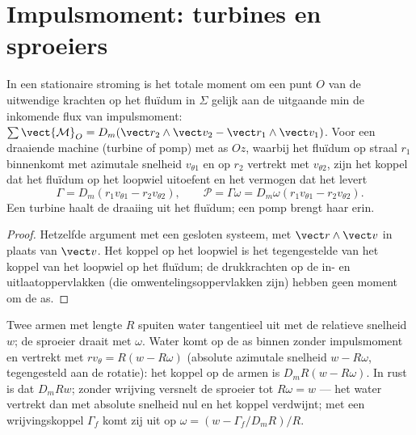 \section{Impulsmoment: turbines en sproeiers}

\begin{theorem}\label{thm:b2:flow-balances:angular}
In een stationaire stroming is het totale moment om een punt $O$ van de
uitwendige krachten op het fluïdum in $\Sigma$ gelijk aan de uitgaande min
de inkomende flux van impulsmoment:
$\sum\vect{\mathcal M}_O = D_m(\vect r_2\wedge\vect v_2 - \vect r_1
\wedge\vect v_1)$.
Voor een draaiende machine (turbine of pomp) met as $Oz$, waarbij het
fluïdum op straal $r_1$ binnenkomt met azimutale snelheid $v_{\theta1}$ en
op $r_2$ vertrekt met $v_{\theta2}$, zijn het koppel dat het fluïdum op het
loopwiel uitoefent en het vermogen dat het levert
\[
\Gamma = D_m(r_1v_{\theta1} - r_2v_{\theta2}) , \qquad
\mathcal P = \Gamma\omega = D_m\omega(r_1v_{\theta1} - r_2v_{\theta2}) .
\]
Een turbine haalt de draaiing uit het fluïdum; een pomp brengt haar erin.
\end{theorem}

\begin{proof}
Hetzelfde argument met een gesloten systeem, met $\vect r\wedge\vect v$ in
plaats van $\vect v$. Het koppel op het loopwiel is het tegengestelde van
het koppel van het loopwiel op het fluïdum; de drukkrachten op de in- en
uitlaatoppervlakken (die omwentelingsoppervlakken zijn) hebben geen moment
om de as.
\end{proof}

\begin{example}[De gazonsproeier]\label{ex:b2:flow-balances:sprinkler}
Twee armen met lengte $R$ spuiten water tangentieel uit met de relatieve
snelheid $w$; de sproeier draait met $\omega$. Water komt op de as binnen
zonder impulsmoment en vertrekt met $r v_\theta = R(w - R\omega)$ (absolute
azimutale snelheid $w - R\omega$, tegengesteld aan de rotatie): het koppel
op de armen is $D_mR(w - R\omega)$. In rust is dat $D_mRw$; zonder wrijving
versnelt de sproeier tot $R\omega = w$ --- het water vertrekt dan met
absolute snelheid nul en het koppel verdwijnt; met een wrijvingskoppel
$\Gamma_f$ komt zij uit op $\omega = (w - \Gamma_f/D_mR)/R$.
\end{example}

